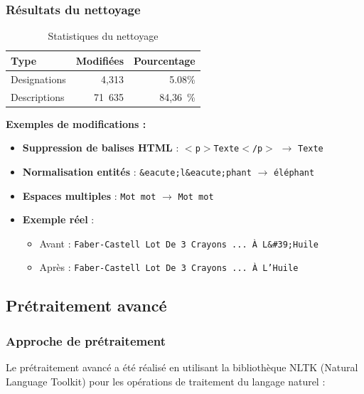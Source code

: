 \documentclass[12pt,a4paper]{article}
\begin{document}
\subsubsection{Résultats du nettoyage}

\begin{table}[H]
\centering
\begin{tabular}{@{}lrr@{}}
\toprule
\textbf{Type} & \textbf{Modifiées} & \textbf{Pourcentage} \\
\midrule
Designations & 4,313 & 5.08\% \\
Descriptions & 71~635 & 84,36~\% \\
\bottomrule
\end{tabular}
\caption{Statistiques du nettoyage}
\label{tab:stats_nettoyage}
\end{table}

\textbf{Exemples de modifications :}

\begin{itemize}
    \item \textbf{Suppression de balises HTML} : \texttt{$<$p$>$Texte$<$/p$>$} $\rightarrow$ \texttt{Texte}
    \item \textbf{Normalisation entités} : \texttt{\&eacute;l\&eacute;phant} $\rightarrow$ \texttt{éléphant}
    \item \textbf{Espaces multiples} : \texttt{Mot    mot} $\rightarrow$ \texttt{Mot mot}
    \item \textbf{Exemple réel} : 
    \begin{itemize}
        \item Avant : \texttt{Faber-Castell Lot De 3 Crayons ... À L\&\#39;Huile}
        \item Après : \texttt{Faber-Castell Lot De 3 Crayons ... À L'Huile}
    \end{itemize}
\end{itemize}

\subsection{Prétraitement avancé}

\subsubsection{Approche de prétraitement}

Le prétraitement avancé a été réalisé en utilisant la bibliothèque NLTK (Natural Language Toolkit) pour les opérations de traitement du langage naturel :
\end{document}
